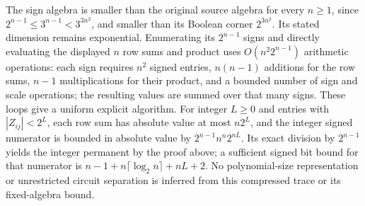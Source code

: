 The sign algebra is smaller than the original source algebra for
every $n\ge1$, since $2^{n-1}\le3^{n-1}<3^{3n^2}$, and smaller
than its Boolean corner $2^{3n^2}$. Its stated dimension remains
exponential. Enumerating its $2^{n-1}$ signs and directly evaluating
the displayed $n$ row sums and product uses $O(n^2 2^{n-1})$
arithmetic operations: each sign requires $n^2$ signed entries,
$n(n-1)$ additions for the row sums, $n-1$ multiplications for
their product, and a bounded number of sign and scale operations;
the resulting values are summed over that many signs. These loops
give a uniform explicit algorithm. For integer $L\ge0$ and entries with
$|Z_{ij}|<2^L$, each row sum has absolute value at most $n2^L$,
and the integer signed numerator is bounded in absolute value by
$2^{n-1}n^n2^{nL}$. Its exact division by $2^{n-1}$ yields the
integer permanent by the proof above; a sufficient signed bit bound
for that numerator is
$n-1+n\lceil\log_2 n\rceil+nL+2$.
No polynomial-size representation or unrestricted circuit separation
is inferred from this compressed trace or its fixed-algebra bound.
